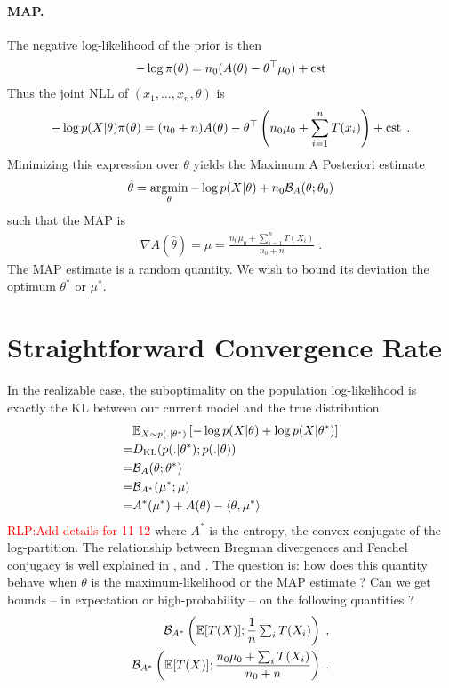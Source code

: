 \documentclass{article}
\newcommand{\RLP}[1]{\textcolor{red}{RLP:#1}}
\newcommand*{\expect}[2][]{\ensuremath{\mathbb{E}_{#1} \left[ #2 \right] }} %
\newcommand{\logpart}{A}
\newcommand{\conj}{\logpart^*}
\newcommand{\bregman}{\cB_\logpart}
\newcommand{\bregmanconj}{\cB_{\logpart^*}}
\newcommand{\natp}{\theta}
\newcommand{\meanp}{\mu}
\begin{document}
\paragraph{MAP.}
The negative log-likelihood of the prior is then
\begin{align*}
    -\log \pi(\natp) = n_0 (\logpart(\natp)  - \natp^\top \meanp_0 ) + \cst
\end{align*}
Thus the joint NLL of $(x_1,\dots,x_n,\natp)$ is
\begin{align}
    -\log p(X|\natp)\pi(\natp) 
    = (n_0+n) \logpart (\natp) 
    - \theta^\top \left(n_0 \meanp_0 + \sum_{i=1}^n T(x_i) \right) + \cst \; .
\end{align}
Minimizing this expression over $\natp$ yields the Maximum A Posteriori estimate
\begin{align}
    \hat \natp = \argmin_\natp -\log p(X|\natp) + n_0 \bregman(\natp ; \natp_0)
\end{align}
such that the MAP is
\begin{align}
    \nabla \logpart(\hat \natp) = \hat \meanp
    = \frac{n_0 \meanp_0 + \sum_{i=1}^n T(X_i) }{n_0+n} \; .
\end{align}
The MAP estimate is a random quantity. We wish to bound its deviation the optimum $\natp^*$ or $\meanp^*$.


\section{Straightforward Convergence Rate}
In the realizable case, the suboptimality on the population log-likelihood is exactly the KL between our current model and the true distribution
\begin{align}
    &\expect[X\sim p(.|\natp^*)]{-\log p(X|\natp) + \log p(X|\natp^*)}\\
    =& \KL( p(.|\natp^*) ; p(.|\natp)) \\
    =& \bregman (\natp ; \natp^*) \\
    =& \bregmanconj ( \meanp^* ; \meanp) \\
    =& \conj(\mu^*) + \logpart(\natp) - \langle \natp , \mu^* \rangle
\end{align}
\RLP{Add details for 11 12}
where $\conj$ is the entropy, the convex conjugate of the log-partition.
The relationship between Bregman divergences and Fenchel conjugacy is well explained in \citet{wainwright2008graphical}, and \citet{agarwal2010geometric}. 
The question is: how does this quantity behave when $\natp$ is the maximum-likelihood or the MAP estimate ? Can we get bounds -- in expectation or high-probability -- on the following quantities ?
\begin{align}
	\label{eq:bregmanMLE}
	\bregmanconj \left (\E [T(X)] ;  \inv{n}  \smallsum_i T(X_i) \right ) \; , \\
	\label{eq:bregmanMAP}
	\bregmanconj \left (\E [T(X)] ; \frac{n_0 \mu_0 + \smallsum_i T(X_i)}{n_0+n} \right ) \; .
\end{align}
\end{document}
